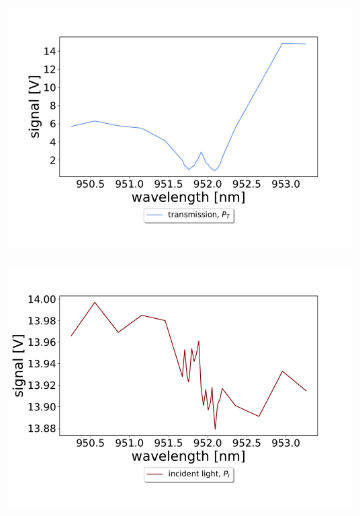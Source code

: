 \begin{figure}[h!]
    \centering
    \begin{subfigure}[b]{0.49\textwidth}
        \includegraphics[width=\textwidth]{figures/raw_data_cavity_trans.pdf}
        \caption{}
        \label{fig:raw_data_trans_with_cavity}
    \end{subfigure}
    \begin{subfigure}[b]{0.49\textwidth}
        \includegraphics[width=\textwidth]{figures/raw_data_incident_light_cavity.pdf}
        \caption{}
        \label{fig:raw_data_incident_with_cavity}
    \end{subfigure}
    \begin{subfigure}[b]{0.49\textwidth}

\end{subfigure}
\end{figure}
